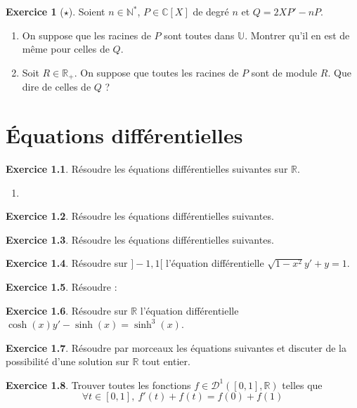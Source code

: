 \documentclass[french]{book}
\newcommand{\N}{\mathbb{N}}
\newcommand{\R}{\mathbb{R}}
\newcommand{\C}{\mathbb{C}}
\newcommand{\U}{\mathbb{U}}
\newcommand{\st}{^*}
\theoremstyle{definition}
\newtheorem{ex}{Exercice}[chapter]
\theoremstyle{theorem}
\theoremstyle{remark}
\begin{document}
\begin{ex}[$\star$]
	Soient $n\in\N\st$, $P\in\C[X]$ de degré $n$ et $Q=2XP'-nP$.
	\begin{enumerate}
		\item On suppose que les racines de $P$ sont toutes dans $\U$. Montrer qu'il en est de même pour celles de $Q$.
		\item Soit $R\in\R_+$. On suppose que toutes les racines de $P$ sont de module $R$. Que dire de celles de $Q$ ?
	\end{enumerate}
\end{ex}

\chapter{Équations différentielles}

\begin{ex}
	Résoudre les équations différentielles suivantes sur $\R$.
	\begin{enumerate}
		\item 
	\end{enumerate}
\end{ex}

\begin{ex}
	Résoudre les équations différentielles suivantes.
\end{ex}

\begin{ex}
	Résoudre les équations différentielles suivantes.
\end{ex}

\begin{ex}
	Résoudre sur $]-1,1[$ l'équation différentielle $\sqrt{1-x^2}y'+y=1$.
\end{ex}

\begin{ex}
	Résoudre : 
\end{ex}

\begin{ex}
	Résoudre sur $\R$ l'équation différentielle $\cosh(x)y'-\sinh(x)=\sinh^3(x)$.
\end{ex}

\begin{ex}
	Résoudre par morceaux les équations suivantes et discuter de la possibilité d'une solution sur $\R$ tout entier.
\end{ex}

\begin{ex}
	Trouver toutes les fonctions $f\in\mathcal{D}^1([0,1],\R)$ telles que $$\forall t\in[0,1],\ f'(t)+f(t)=f(0)+f(1)$$
\end{ex}
\end{document}
